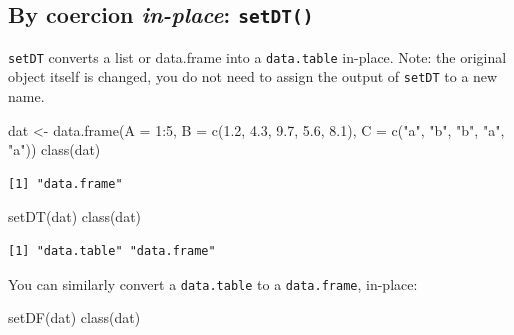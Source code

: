 \documentclass[
]{book}
\newenvironment{Shaded}{\begin{snugshade}}{\end{snugshade}}
\newcommand{\AttributeTok}[1]{\textcolor[rgb]{0.77,0.63,0.00}{#1}}
\newcommand{\DecValTok}[1]{\textcolor[rgb]{0.00,0.00,0.81}{#1}}
\newcommand{\FloatTok}[1]{\textcolor[rgb]{0.00,0.00,0.81}{#1}}
\newcommand{\FunctionTok}[1]{\textcolor[rgb]{0.00,0.00,0.00}{#1}}
\newcommand{\NormalTok}[1]{#1}
\newcommand{\OtherTok}[1]{\textcolor[rgb]{0.56,0.35,0.01}{#1}}
\newcommand{\SpecialCharTok}[1]{\textcolor[rgb]{0.00,0.00,0.00}{#1}}
\newcommand{\StringTok}[1]{\textcolor[rgb]{0.31,0.60,0.02}{#1}}
\begin{document}
\hypertarget{by-coercion-in-place-setdt}{%
\subsection{\texorpdfstring{By coercion \textbf{\emph{in-place}}: \texttt{setDT()}}{By coercion in-place: setDT()}}\label{by-coercion-in-place-setdt}}

\texttt{setDT} converts a list or data.frame into a \texttt{data.table} in-place. Note: the original object itself is changed, you do not need to assign the output of \texttt{setDT} to a new name.

\begin{Shaded}
\begin{Highlighting}[]
\NormalTok{dat }\OtherTok{\textless{}{-}} \FunctionTok{data.frame}\NormalTok{(}\AttributeTok{A =} \DecValTok{1}\SpecialCharTok{:}\DecValTok{5}\NormalTok{,}
                  \AttributeTok{B =} \FunctionTok{c}\NormalTok{(}\FloatTok{1.2}\NormalTok{, }\FloatTok{4.3}\NormalTok{, }\FloatTok{9.7}\NormalTok{, }\FloatTok{5.6}\NormalTok{, }\FloatTok{8.1}\NormalTok{),}
                  \AttributeTok{C =} \FunctionTok{c}\NormalTok{(}\StringTok{"a"}\NormalTok{, }\StringTok{"b"}\NormalTok{, }\StringTok{"b"}\NormalTok{, }\StringTok{"a"}\NormalTok{, }\StringTok{"a"}\NormalTok{))}
\FunctionTok{class}\NormalTok{(dat)}
\end{Highlighting}
\end{Shaded}

\begin{verbatim}
[1] "data.frame"
\end{verbatim}

\begin{Shaded}
\begin{Highlighting}[]
\FunctionTok{setDT}\NormalTok{(dat)}
\FunctionTok{class}\NormalTok{(dat)}
\end{Highlighting}
\end{Shaded}

\begin{verbatim}
[1] "data.table" "data.frame"
\end{verbatim}

You can similarly convert a \texttt{data.table} to a \texttt{data.frame}, in-place:

\begin{Shaded}
\begin{Highlighting}[]
\FunctionTok{setDF}\NormalTok{(dat)}
\FunctionTok{class}\NormalTok{(dat)}
\end{Highlighting}
\end{Shaded}
\end{document}
